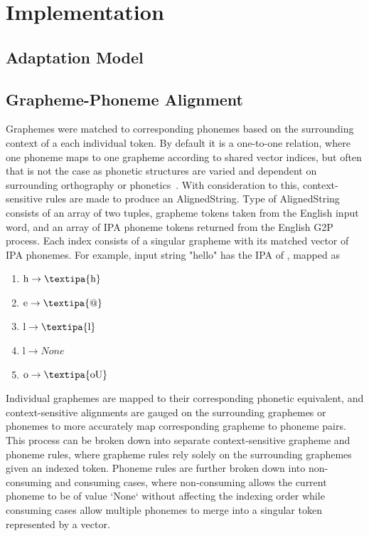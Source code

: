 \section{Implementation}

\subsection{Adaptation Model}

\subsection{Grapheme-Phoneme Alignment}

Graphemes were matched to corresponding phonemes based on the
surrounding context of a each individual token. By default it is
a one-to-one relation, where one phoneme maps to one grapheme
according to shared vector indices, but often that is not the case
as phonetic structures are varied and dependent on surrounding
orthography or phonetics~\cite{Tayao_2004}. With consideration to this,
context-sensitive rules are made to produce an AlignedString. Type of
AlignedString consists of an array of two tuples, grapheme tokens taken 
from the English input word, and an array of IPA phoneme tokens returned from
the English G2P process. Each index consists of a singular grapheme
with its matched vector of IPA phonemes. For example, input string "hello"
has the IPA of , mapped as

\begin{enumerate}
    \item \( \text{h} \rightarrow \text{\textipa{h}}\)
    \item \( \text{e} \rightarrow \text{\textipa{@}}\)
    \item \( \text{l} \rightarrow \text{\textipa{l}}\)
    \item \( \text{l} \rightarrow None \)
    \item \( \text{o} \rightarrow \text{\textipa{oU}}\)
\end{enumerate}

Individual graphemes are mapped to their corresponding phonetic equivalent,
and context-sensitive alignments are gauged on the surrounding graphemes or
phonemes to more accurately map corresponding grapheme to phoneme pairs.
This process can be broken down into separate context-sensitive grapheme
and phoneme rules, where grapheme rules rely solely on the surrounding graphemes given an indexed token.
Phoneme rules are further broken down into non-consuming and consuming cases, where
non-consuming allows the current phoneme to be of value `None` without affecting
the indexing order while consuming cases allow multiple phonemes to merge
into a singular token represented by a vector.

